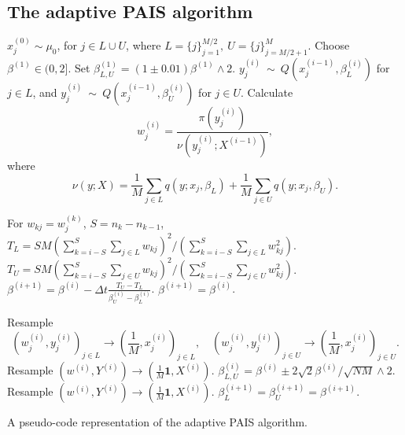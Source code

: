 \documentclass[final]{siamltex}
\begin{document}
\begin{appendix}
\section{The adaptive PAIS algorithm}\label{Sec:App}
\begin{table}[!h]
\begin{mdframed}
\begin{algorithmic}
\STATE $x_j^{(0)} \sim \mu_0$, for $j \in L\cup U$, where $L = \{j\}_{j=1}^{M/2},\ U = \{j\}_{j=M/2+1}^M$.
\STATE Choose $\beta^{(1)} \in (0, 2]$. Set $\beta_{L,U}^{(1)} = (1\pm 0.01)\beta^{(1)}\wedge 2$.
\STATE $y_j^{(i)}~\sim~Q(x_j^{(i-1)},\beta_L^{(i)})$ for $j \in L$, and $y_j^{(i)}~\sim~Q(x_j^{(i-1)},\beta_U^{(i)})$ for $j \in U$.
\STATE Calculate 
\[
	w^{(i)}_j = \frac{\pi(y_j^{(i)})}{\nu(y_j^{(i)};X^{(i-1)})},
\]
where
\[
	\nu(y;X) = \frac{1}{M}\sum_{j\in L} q(y;x_j,\beta_L)+\frac{1}{M}\sum_{j\in U} q(y;x_j,\beta_U).
\]

	\STATE For $w_{kj} = w_j^{(k)}$, $S = n_k - n_{k-1}$,
	\STATE $T_L = SM(\sum_{k=i-S}^S\sum_{j\in L} w_{kj})^2/(\sum_{k=i-S}^S\sum_{j\in L} w_{kj}^2)$.
	\STATE $T_U = SM(\sum_{k=i-S}^S\sum_{j\in U} w_{kj})^2/(\sum_{k=i-S}^S\sum_{j\in U} w_{kj}^2)$.
	\STATE $\beta^{(i+1)} = \beta^{(i)} - \Delta t \displaystyle\frac{T_U - T_L}{\beta_U^{(i)}-\beta_L^{(i)}}$.
\ELSE
	\STATE $\beta^{(i+1)} = \beta^{(i)}$.
\ENDIF

		\STATE Resample 
	\[
		(w_j^{(i)},y_j^{(i)})_{j\in L} \rightarrow (\frac{1}{M}, x_j^{(i)})_{j\in L}, \quad (w_j^{(i)},y_j^{(i)})_{j\in U} \rightarrow (\frac{1}{M}, x_j^{(i)})_{j\in U}.
\]
	\ELSE
		\STATE Resample $(w^{(i)},Y^{(i)}) \rightarrow (\frac{1}{M}\mathbf{1}, X^{(i)})$.
	\ENDIF
	\STATE $\beta_{L,U}^{(i)} = \beta^{(i)} \pm 2\sqrt{2}\beta^{(i)}/\sqrt{NM} \wedge 2$.
\ELSE
		\STATE Resample $(w^{(i)},Y^{(i)}) \rightarrow (\frac{1}{M}\mathbf{1}, X^{(i)})$.
		\STATE $\beta_L^{(i+1)} = \beta_U^{(i+1)} = \beta^{(i+1)}$.
\ENDIF
\ENDFOR
\end{algorithmic}
\end{mdframed}\caption{A pseudo-code representation of the adaptive
  PAIS algorithm.}
\label{tab:adapt}
\end{table}
\end{appendix}
\end{document}
